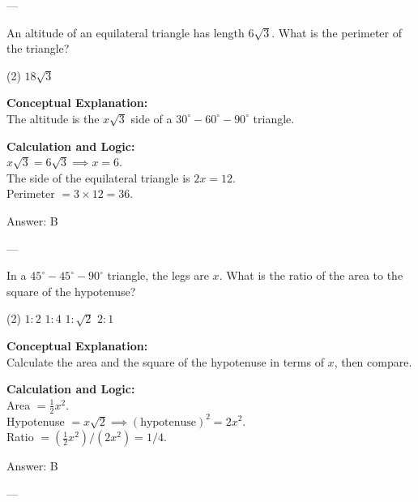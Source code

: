 \documentclass[11pt,paper=a4,answers]{exam}
\begin{document}
\begin{questions}
---

\question
An altitude of an equilateral triangle has length $6\sqrt{3}$. What is the perimeter of the triangle?
\begin{tasks}(2)
    \task $18\sqrt{3}$
\end{tasks}

\begin{solution}
\textbf{Conceptual Explanation:} \\
The altitude is the $x\sqrt{3}$ side of a $30^\circ-60^\circ-90^\circ$ triangle.

\vspace{10pt}
\textbf{Calculation and Logic:} \\
$x\sqrt{3} = 6\sqrt{3} \implies x = 6$. \\
The side of the equilateral triangle is $2x = 12$. \\
Perimeter $= 3 \times 12 = 36$.

\vspace{15pt}
Answer: \colorbox{yellow!100}{B}
\end{solution}

---

\question
In a $45^\circ-45^\circ-90^\circ$ triangle, the legs are $x$. What is the ratio of the area to the square of the hypotenuse?
\begin{tasks}(2)
    \task $1 : 2$
    \task $1 : 4$
    \task $1 : \sqrt{2}$
    \task $2 : 1$
\end{tasks}

\begin{solution}
\textbf{Conceptual Explanation:} \\
Calculate the area and the square of the hypotenuse in terms of $x$, then compare.

\vspace{10pt}
\textbf{Calculation and Logic:} \\
Area $= \frac{1}{2}x^2$. \\
Hypotenuse $= x\sqrt{2} \implies (\text{hypotenuse})^2 = 2x^2$. \\
Ratio $= (\frac{1}{2}x^2) / (2x^2) = 1/4$.

\vspace{15pt}
Answer: \colorbox{yellow!100}{B}
\end{solution}

---


\end{questions}
\end{document}
